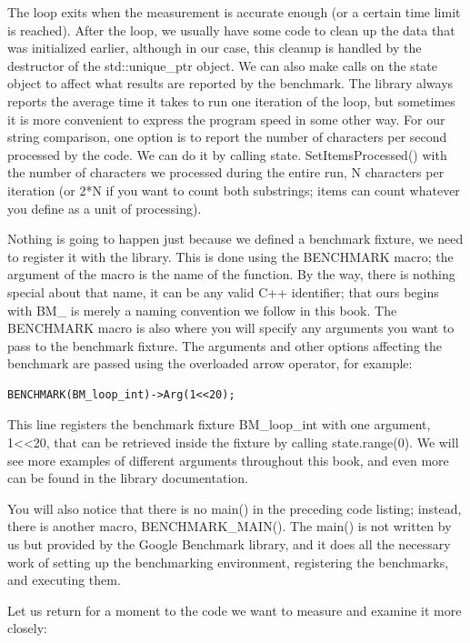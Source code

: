 The loop exits when the measurement is accurate enough (or a certain time limit is reached). After the loop, we usually have some code to clean up the data that was initialized earlier, although in our case, this cleanup is handled by the destructor of the std::unique\_ptr object. We can also make calls on the state object to affect what results are reported by the benchmark. The library always reports the average time it takes to run one iteration of the loop, but sometimes it is more convenient to express the program speed in some other way. For our string comparison, one option is to report the number of characters per second processed by the code. We can do it by calling state. SetItemsProcessed() with the number of characters we processed during the entire run, N characters per iteration (or 2*N if you want to count both substrings; items can count whatever you define as a unit of processing).

Nothing is going to happen just because we defined a benchmark fixture, we need to register it with the library. This is done using the BENCHMARK macro; the argument of the macro is the name of the function. By the way, there is nothing special about that name, it can be any valid C++ identifier; that ours begins with BM\_ is merely a naming convention we follow in this book. The BENCHMARK macro is also where you will specify any arguments you want to pass to the benchmark fixture. The arguments and other options affecting the benchmark are passed using the overloaded arrow operator, for example:

\begin{lstlisting}[style=styleCXX]
BENCHMARK(BM_loop_int)->Arg(1<<20);
\end{lstlisting}

This line registers the benchmark fixture BM\_loop\_int with one argument, 1<<20, that can be retrieved inside the fixture by calling state.range(0). We will see more examples of different arguments throughout this book, and even more can be found in the library documentation.

You will also notice that there is no main() in the preceding code listing; instead, there is another macro, BENCHMARK\_MAIN(). The main() is not written by us but provided by the Google Benchmark library, and it does all the necessary work of setting up the benchmarking environment, registering the benchmarks, and executing them.

Let us return for a moment to the code we want to measure and examine it more closely:

